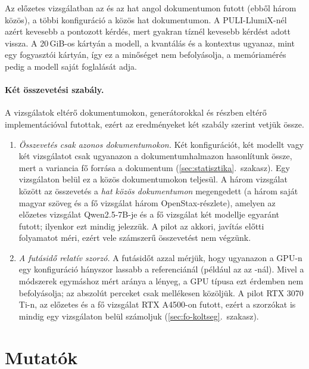 Az előzetes vizsgálatban az  és az  hat angol dokumentumon futott (ebből három közös), a
többi konfiguráció a közös hat dokumentumon. A PULI-LlumiX-nél azért kevesebb a pontozott kérdés, mert
gyakran tíznél kevesebb kérdést adott vissza. A 20\,GiB-os kártyán a modell, a kvantálás és a kontextus
ugyanaz, mint egy fogyasztói kártyán, így ez a minőséget nem befolyásolja, a memóriamérés pedig a modell
saját foglalását adja.

\paragraph{Két összevetési szabály.} A vizsgálatok eltérő dokumentumokon, generátorokkal és részben eltérő
implementációval futottak, ezért az eredményeket két szabály szerint vetjük össze.
\begin{enumerate}[label=(\arabic*)]
\item \emph{Összevetés csak azonos dokumentumokon.} Két konfigurációt, két modellt vagy két vizsgálatot
csak ugyanazon a dokumentumhalmazon hasonlítunk össze, mert a variancia fő forrása a dokumentum
(\ref{sec:statisztika}.~szakasz). Egy vizsgálaton belül ez a közös dokumentumokon teljesül. A három
vizsgálat között az összevetés a \emph{hat közös dokumentumon} megengedett (a három saját magyar szöveg és
a fő vizsgálat három OpenStax-részlete), amelyen az előzetes vizsgálat Qwen2.5-7B-je és a fő vizsgálat két
modellje egyaránt futott; ilyenkor ezt mindig jelezzük. A pilot az akkori, javítás előtti folyamatot méri,
ezért vele számszerű összevetést nem végzünk.
\item \emph{A futásidő relatív szorzó.} A futásidőt azzal mérjük, hogy ugyanazon a GPU-n egy konfiguráció
hányszor lassabb a referenciánál (például az  az -nál). Mivel a módszerek egymáshoz mért
aránya a lényeg, a GPU típusa ezt érdemben nem befolyásolja; az abszolút perceket csak
mellékesen közöljük. A pilot RTX 3070 Ti-n, az előzetes és a fő vizsgálat RTX A4500-on futott, ezért a
szorzókat is mindig egy vizsgálaton belül számoljuk (\ref{sec:fo-koltseg}.~szakasz).
\end{enumerate}

\section{Mutatók}
\label{sec:mutatok}

